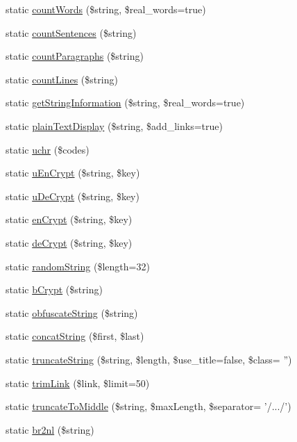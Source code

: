 \begin{DoxyCompactItemize}
static \hyperlink{class_strings_ac1d162232b576be8b842cb231d2c896c}{count\-Words} (\$string, \$real\-\_\-words=true)
\item 
static \hyperlink{class_strings_a0698d2fa7682ef3da795776ee6e90385}{count\-Sentences} (\$string)
\item 
static \hyperlink{class_strings_a85980f19847b2915e0baf8083e0b3ad7}{count\-Paragraphs} (\$string)
\item 
static \hyperlink{class_strings_a8cbd56baae43628ea39b0cdbe669b1c2}{count\-Lines} (\$string)
\item 
static \hyperlink{class_strings_a58735342f16eb3e91078974bfd25cf67}{get\-String\-Information} (\$string, \$real\-\_\-words=true)
\item 
static \hyperlink{class_strings_aa0901247ed57e316f50cddf9081961f2}{plain\-Text\-Display} (\$string, \$add\-\_\-links=true)
\item 
static \hyperlink{class_strings_a94e67689a8448c1b41c1d7ee676ba5aa}{uchr} (\$codes)
\item 
static \hyperlink{class_strings_ad8bd383229cf1b6ea12382d87cd6197c}{u\-En\-Crypt} (\$string, \$key)
\item 
static \hyperlink{class_strings_addbb4a9858963e10aa0abd9b74f582b6}{u\-De\-Crypt} (\$string, \$key)
\item 
static \hyperlink{class_strings_aef4f404d3cadc90a2ab8e194671b50dc}{en\-Crypt} (\$string, \$key)
\item 
static \hyperlink{class_strings_a1ca847962c94a3b6056fa3e5ac35beda}{de\-Crypt} (\$string, \$key)
\item 
static \hyperlink{class_strings_a33a820a1d9c556fdfdec789c5995cbb8}{random\-String} (\$length=32)
\item 
static \hyperlink{class_strings_a6473a3b0a546311c602e7ead3c736b5f}{b\-Crypt} (\$string)
\item 
static \hyperlink{class_strings_a6b125755d68b26f0094282e606db5adf}{obfuscate\-String} (\$string)
\item 
static \hyperlink{class_strings_aa7d72dc2ad190c99a835ca166fcde5e3}{concat\-String} (\$first, \$last)
\item 
static \hyperlink{class_strings_a80b940af97e8b1ad75633c284504f967}{truncate\-String} (\$string, \$length, \$use\-\_\-title=false, \$class= '')
\item 
static \hyperlink{class_strings_aee17fee211824626f66dc2693d26c1c4}{trim\-Link} (\$link, \$limit=50)
\item 
static \hyperlink{class_strings_ab843435eff6eb4c1451551faea2b62a3}{truncate\-To\-Middle} (\$string, \$max\-Length, \$separator= '/.../')
\item 
static \hyperlink{class_strings_a906e45c0013f13f47185e1fc8bed6fcb}{br2nl} (\$string)
\end{DoxyCompactItemize}
